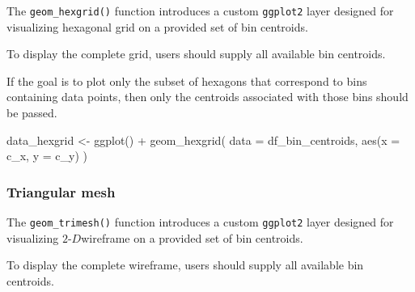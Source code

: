 \documentclass[
  11pt,
  a4paper,
]{report}
\newenvironment{Shaded}{\begin{snugshade}}{\end{snugshade}}
\newcommand{\AttributeTok}[1]{\textcolor[rgb]{0.40,0.45,0.13}{#1}}
\newcommand{\FunctionTok}[1]{\textcolor[rgb]{0.28,0.35,0.67}{#1}}
\newcommand{\NormalTok}[1]{\textcolor[rgb]{0.00,0.23,0.31}{#1}}
\newcommand{\OtherTok}[1]{\textcolor[rgb]{0.00,0.23,0.31}{#1}}
\newcommand{\SpecialCharTok}[1]{\textcolor[rgb]{0.37,0.37,0.37}{#1}}
\newcommand{\twoD}{$2\text{-}D$}
\begin{document}
The \texttt{geom\_hexgrid()} function introduces a custom
\texttt{ggplot2} layer designed for visualizing hexagonal grid on a
provided set of bin centroids.

To display the complete grid, users should supply all available bin
centroids.

\begin{Shaded}
\end{Shaded}

If the goal is to plot only the subset of hexagons that correspond to
bins containing data points, then only the centroids associated with
those bins should be passed.

\begin{Shaded}
\begin{Highlighting}[]
\NormalTok{data\_hexgrid }\OtherTok{\textless{}{-}} \FunctionTok{ggplot}\NormalTok{() }\SpecialCharTok{+} 
  \FunctionTok{geom\_hexgrid}\NormalTok{(}
    \AttributeTok{data =}\NormalTok{ df\_bin\_centroids, }
    \FunctionTok{aes}\NormalTok{(}\AttributeTok{x =}\NormalTok{ c\_x, }\AttributeTok{y =}\NormalTok{ c\_y)}
\NormalTok{    ) }
\end{Highlighting}
\end{Shaded}

\subsubsection{Triangular mesh}\label{triangular-mesh}

The \texttt{geom\_trimesh()} function introduces a custom
\texttt{ggplot2} layer designed for visualizing \twoD wireframe on a
provided set of bin centroids.

To display the complete wireframe, users should supply all available bin
centroids.

\begin{Shaded}
\end{Shaded}
\end{document}
